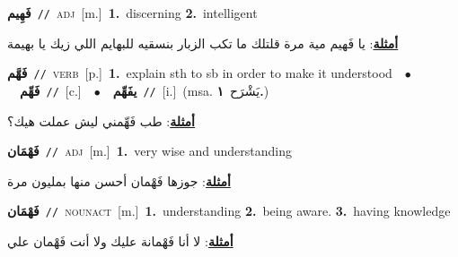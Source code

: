 \documentclass[10pt,a4paper,twoside]{article} %
\begin{document}
\begin{multicols}{2}
{\setlength\topsep{0pt}\textbf{\foreignlanguage{arabic}{فَهِيم}}\ {\color{gray}\texttt{//}\color{black}}\ \textsc{adj}\ [m.]\ \textbf{1.}~discerning  \textbf{2.}~intelligent\  \begin{flushright}\color{gray}\foreignlanguage{arabic}{\textbf{\underline{\foreignlanguage{arabic}{أمثلة}}}: يا فَهيم مية مرة قلتلك ما تكب الزبار بنسقيه للبهايم اللي زيك يا بهيمة}\end{flushright}\color{black}} \vspace{2mm}

{\setlength\topsep{0pt}\textbf{\foreignlanguage{arabic}{فَهَّم}}\ {\color{gray}\texttt{//}\color{black}}\ \textsc{verb}\ [p.]\ \textbf{1.}~explain sth to sb in order to make it understood\ \ $\bullet$\ \ \setlength\topsep{0pt}\textbf{\foreignlanguage{arabic}{فَهِّم}}\ {\color{gray}\texttt{//}\color{black}}\ [c.]\ \ $\bullet$\ \ \setlength\topsep{0pt}\textbf{\foreignlanguage{arabic}{يفَهِّم}}\ {\color{gray}\texttt{//}\color{black}}\ [i.]\ \color{gray}(msa. \foreignlanguage{arabic}{يَشْرَح}~\foreignlanguage{arabic}{\textbf{١.}})\color{black}\  \begin{flushright}\color{gray}\foreignlanguage{arabic}{\textbf{\underline{\foreignlanguage{arabic}{أمثلة}}}: طب فَهِّمني ليش عملت هيك؟}\end{flushright}\color{black}} \vspace{2mm}

{\setlength\topsep{0pt}\textbf{\foreignlanguage{arabic}{فَهْمَان}}\ {\color{gray}\texttt{//}\color{black}}\ \textsc{adj}\ [m.]\ \textbf{1.}~very wise and understanding\  \begin{flushright}\color{gray}\foreignlanguage{arabic}{\textbf{\underline{\foreignlanguage{arabic}{أمثلة}}}: جوزها فَهْمان أحسن منها بمليون مرة}\end{flushright}\color{black}} \vspace{2mm}

{\setlength\topsep{0pt}\textbf{\foreignlanguage{arabic}{فَهْمَان}}\ {\color{gray}\texttt{//}\color{black}}\ \textsc{noun\textunderscore act}\ [m.]\ \textbf{1.}~understanding  \textbf{2.}~being aware.  \textbf{3.}~having knowledge\  \begin{flushright}\color{gray}\foreignlanguage{arabic}{\textbf{\underline{\foreignlanguage{arabic}{أمثلة}}}: لا أنا فَهْمانة عليك ولا أنت فَهْمان علي}\end{flushright}\color{black}} \vspace{2mm}


\end{multicols}
\end{document}

